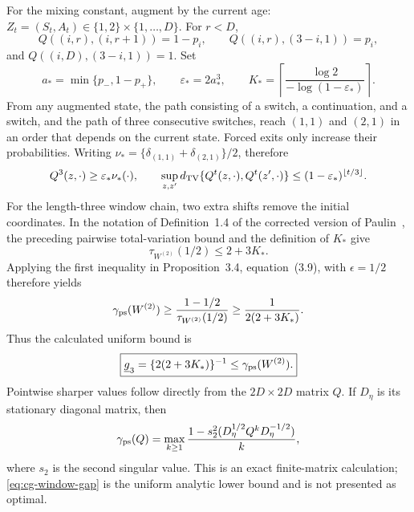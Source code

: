 For the mixing constant, augment by the current age:
$Z_t=(S_t,A_t)\in\{1,2\}\times\{1,\ldots,D\}$.  For $r<D$,
\[
 Q((i,r),(i,r+1))=1-p_i,\qquad
 Q((i,r),(3-i,1))=p_i,
\]
and $Q((i,D),(3-i,1))=1$.  Set
\begin{equation}
 a_*=\min\{p_-,1-p_+\},\qquad
 \varepsilon_*=2a_*^3,\qquad
 K_*=\left\lceil\frac{\log2}{-\log(1-\varepsilon_*)}\right\rceil.
 \label{eq:cg-mix-constants}
\end{equation}
From any augmented state, the path consisting of a switch, a continuation,
and a switch, and the path of three consecutive switches, reach $(1,1)$ and
$(2,1)$ in an order that depends on the current state.  Forced exits only
increase their probabilities.
Writing $\nu_*=\{\delta_{(1,1)}+\delta_{(2,1)}\}/2$, therefore
\begin{equation}
 Q^3(z,\cdot)\ge\varepsilon_*\nu_*(\cdot),\qquad
 \sup_{z,z'}d_{\rm TV}\{Q^t(z,\cdot),Q^t(z',\cdot)\}
 \le(1-\varepsilon_*)^{\lfloor t/3\rfloor}.
 \label{eq:cg-doeblin}
\end{equation}
For the length-three window chain, two extra shifts remove the initial
coordinates.  In the notation of Definition~1.4 of the corrected version of
Paulin~\cite{Paulin2015}, the preceding pairwise total-variation bound and the
definition of $K_*$ give
\[
 \tau_{W^{(2)}}(1/2)\le 2+3K_*.
\]
Applying the first inequality in Proposition~3.4, equation~(3.9), with
$\epsilon=1/2$ therefore yields
\[
 \gamma_{\rm ps}(W^{(2)})
 \ge \frac{1-1/2}{\tau_{W^{(2)}}(1/2)}
 \ge \frac{1}{2(2+3K_*)}.
\]
Thus the calculated uniform bound is
\begin{equation}
 \boxed{
 \underline g_3=
 \{2(2+3K_*)\}^{-1}\le\gamma_{\rm ps}(W^{(2)}).}
 \label{eq:cg-window-gap}
\end{equation}
Pointwise sharper values follow directly from the $2D\times2D$ matrix $Q$.
If $D_\eta$ is its stationary diagonal matrix, then
\begin{equation}
 \gamma_{\rm ps}(Q)=\max_{k\ge1}
 \frac{1-s_2^2(D_\eta^{1/2}Q^kD_\eta^{-1/2})}{k},
 \label{eq:cg-exact-pseudogap}
\end{equation}
where $s_2$ is the second singular value.  This is an exact finite-matrix
calculation; \eqref{eq:cg-window-gap} is the uniform analytic lower bound and
is not presented as optimal.

